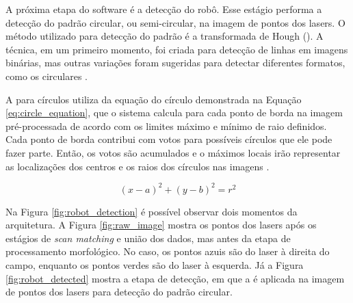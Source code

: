\documentclass[acronym, symbols, table]{fei}
\begin{document}
				A próxima etapa do software é a detecção do robô. Esse estágio performa a detecção do padrão circular, ou semi-circular, na imagem de pontos dos lasers. O método utilizado para detecção do padrão é a transformada de Hough (). A técnica, em um primeiro momento, foi criada para detecção de linhas em imagens binárias, mas outras variações foram sugeridas para detectar diferentes formatos, como os circulares \cite{mukhopadhyay2015survey}.
				
				A  para círculos utiliza da equação do círculo demonstrada na Equação \eqref{eq:circle_equation}, que o sistema calcula para cada ponto de borda na imagem pré-processada de acordo com os limites máximo e mínimo de raio definidos. Cada ponto de borda contribui com votos para possíveis círculos que ele pode fazer parte. Então, os votos são acumulados e o máximos locais irão representar as localizações dos centros e os raios dos círculos nas imagens \cite{hassanein2015survey}.

%				
				\begin{equation}
					\label{eq:circle_equation}
					(x-a)^2 + (y-b)^2 = r^2
				\end{equation}
			
				Na Figura \ref{fig:robot_detection} é possível observar dois momentos da arquitetura. A Figura \ref{fig:raw_image} mostra os pontos dos lasers após os estágios de \textit{scan matching} e união dos dados, mas antes da etapa de processamento morfológico. No caso, os pontos azuis são do laser à direita do campo, enquanto os pontos verdes são do laser à esquerda. Já a Figura \ref{fig:robot_detected} mostra a etapa de detecção, em que a  é aplicada na imagem de pontos dos lasers para detecção do padrão circular.
				
\end{document}
